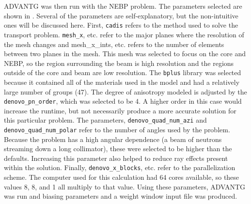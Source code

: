 ADVANTG was then run with the NEBP problem.
The parameters selected are shown in .
Several of the parameters are self-explanatory, but the non-intuitive ones will be discussed here.
First, {\tt cadis} refers to the method used to solve the transport problem.
{\tt mesh\_x}, etc. refer to the major planes where the resolution of the mesh changes and {mesh\_x\_ints}, etc. refers to the number of elements between two planes in the mesh.
This mesh was selected to focus on the core and NEBP, so the region surrounding the beam is high resolution and the regions outside of the core and beam are low resolution.
The {\tt bplus} library was selected because it contained all of the materials used in the model and had a relatively large number of groups (47).
The degree of anisotropy modeled is adjusted by the {\tt denovo\_pn\_order}, which was selected to be 4.
A higher order in this case would increase the runtime, but not necessarily produce a more accurate solution for this particular problem.
The parameters, {\tt denovo\_quad\_num\_azi} and {\tt denovo\_quad\_num\_polar} refer to the number of angles used by the problem.
Because the problem has a high angular dependence (a beam of neutrons streaming down a long collimator), these were selected to be higher than the defaults.
Increasing this parameter also helped to reduce ray effects present within the solution.
Finally, {\tt denovo\_x\_blocks}, etc. refer to the parallelization scheme.
The computer used for this calculation had 64 cores available, so these values 8, 8, and 1 all multiply to that value.
Using these parameters, ADVANTG was run and biasing parameters and a weight window input file was produced.

